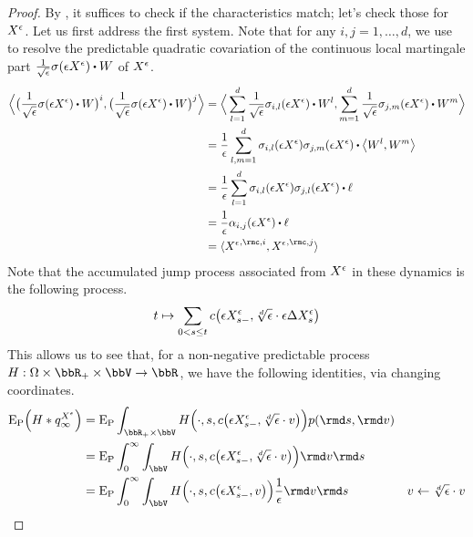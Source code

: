 \begin{proof}
  \label{proof:proposition:sde-asymptotics}
  By \cite[III.2.26]{jacod2003}, it suffices to check if the characteristics match; let's check those for $X^\epsilon$.
  Let us first address the first system.
  Note that for any $i, j = 1, \ldots, d$, we use \cite[Theorem I.4.40(d)]{jacod2003} to resolve the predictable quadratic covariation of the continuous local martingale part $\frac{1}{\sqrt\epsilon} \affDiffSqrt(\Xe) \shortInt \W$ of $X^\epsilon$.
  \begin{align*}
    \Bprj{\big(\frac{1}{\sqrt\epsilon} \affDiffSqrt(\Xe) \shortInt\W\big)^i}{\big(\frac{1}{\sqrt\epsilon} \affDiffSqrt(\Xe) \shortInt\W\big)^j}
    &= \Bprj{\sum_{l=1}^d \frac{1}{\sqrt\epsilon} \affDiffSqrt_{i,l}(\Xe) \shortInt\W^l}{\sum_{m=1}^d \frac{1}{\sqrt\epsilon} \affDiffSqrt_{j,m}(\Xe) \shortInt\W^m} \\
    &= \frac1\epsilon\sum_{l,m=1}^d \affDiffSqrt_{i,l}(\Xe)\affDiffSqrt_{j,m}(\Xe) \shortInt \bprj{\W^l}{\W^m} \\
    &= \frac1\epsilon\sum_{l=1}^d \affDiffSqrt_{i,l}(\Xe)\affDiffSqrt_{j,l}(\Xe) \shortInt \leb \\
    &= \frac1\epsilon \affDiff_{i,j}(\Xe) \shortInt \leb \\
    &= \prj{{\Xee}^{,\rmc,i}}{{\Xee}^{,\rmc,j}}
  \end{align*}
  Note that the accumulated jump process associated from $X^\epsilon$ in these dynamics is the following process.
  \begin{equation*}
    t \mapsto \sum_{0<s\leq t} c\big(\epsilon X^\epsilon_{s-}, \sqrt[d]{\epsilon} \cdot \epsilon\Delta X^\epsilon_s \big) 
  \end{equation*}
  This allows us to see that, for a non-negative predictable process $H: \Omega \times \bbR_+ \times \vecSpace \rightarrow \bbR$, we have the following identities, via changing coordinates.
  \begin{align*}
    \Exp_\Prb\Big( H \ast \jumpMeas^{\Xee}_\infty \Big)
    &= \Exp_\Prb \int_{\bbR_+\times\vecSpace} H\Big(\cdot, s, \thinner\big(\Xe_{s-}, \sqrt[d]{\epsilon} \cdot \markVar\big) \Big) \poisRM(\rmd s, \rmd\markVar) \\
    &= \Exp_\Prb \int_0^\infty \int_\vecSpace H\Big(\cdot, s, \thinner\big(\Xe_{s-}, \sqrt[d]{\epsilon} \cdot \markVar\big) \Big) \rmd\markVar\rmd s \\
    &= \Exp_\Prb \int_0^\infty \int_\vecSpace H\Big(\cdot, s, \thinner\big(\Xe_{s-}, \markVar\big) \Big) \frac1\epsilon \rmd\markVar \rmd s & \markVar \leftarrow \sqrt[d]{\epsilon} \cdot \markVar \\

\end{align*}
\end{proof}
